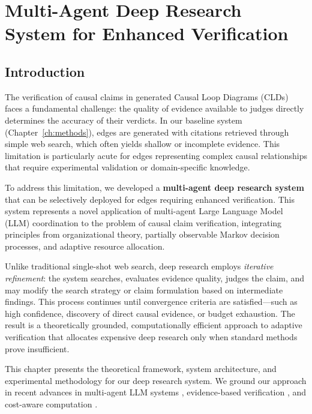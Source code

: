 \chapter{Multi-Agent Deep Research System for Enhanced Verification}
\label{ch:deep_research}

\section{Introduction}

The verification of causal claims in generated Causal Loop Diagrams (CLDs) faces a fundamental challenge: the quality of evidence available to judges directly determines the accuracy of their verdicts. In our baseline system (Chapter~\ref{ch:methods}), edges are generated with citations retrieved through simple web search, which often yields shallow or incomplete evidence. This limitation is particularly acute for edges representing complex causal relationships that require experimental validation or domain-specific knowledge.

To address this limitation, we developed a \textbf{multi-agent deep research system} that can be selectively deployed for edges requiring enhanced verification. This system represents a novel application of multi-agent Large Language Model (LLM) coordination to the problem of causal claim verification, integrating principles from organizational theory, partially observable Markov decision processes, and adaptive resource allocation.

Unlike traditional single-shot web search, deep research employs \textit{iterative refinement}: the system searches, evaluates evidence quality, judges the claim, and may modify the search strategy or claim formulation based on intermediate findings. This process continues until convergence criteria are satisfied—such as high confidence, discovery of direct causal evidence, or budget exhaustion. The result is a theoretically grounded, computationally efficient approach to adaptive verification that allocates expensive deep research only when standard methods prove insufficient.

This chapter presents the theoretical framework, system architecture, and experimental methodology for our deep research system. We ground our approach in recent advances in multi-agent LLM systems \citep{li2023theory, zhang2025athenian, smith2025organizational}, evidence-based verification \citep{automated_factchecking_survey, wadden2022scifact}, and cost-aware computation \citep{osca_inference, selfbudgeter2025}.

